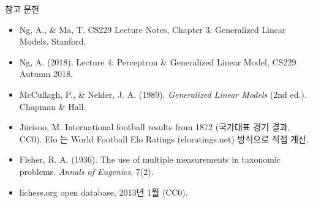 \documentclass[aspectratio=169,11pt,t]{beamer}
\newcommand{\paperlink}[1]{\href{#1}{\textcolor{ksablue}{\faLink}}}
\begin{document}
\begin{frame}{참고 문헌}
\vfill
\small
\begin{itemize}
\item Ng, A., \& Ma, T. CS229 Lecture Notes, Chapter 3: Generalized Linear Models. Stanford. \paperlink{https://cs229.stanford.edu/main_notes.pdf}
\item Ng, A. (2018). Lecture 4: Perceptron \& Generalized Linear Model, CS229 Autumn 2018. \paperlink{https://www.youtube.com/watch?v=iZTeva0WSTQ}
\item McCullagh, P., \& Nelder, J. A. (1989). \textit{Generalized Linear Models} (2nd ed.). Chapman \& Hall.
\item Jürisoo, M. International football results from 1872 (국가대표 경기 결과, CC0). Elo 는 World Football Elo Ratings (eloratings.net) 방식으로 직접 계산. \paperlink{https://github.com/martj42/international_results}
\item Fisher, R. A. (1936). The use of multiple measurements in taxonomic problems. \textit{Annals of Eugenics}, 7(2).
\item lichess.org open database, 2013년 1월 (CC0). \paperlink{https://database.lichess.org}
\end{itemize}
\vfill
{}
\end{frame}
\end{document}
